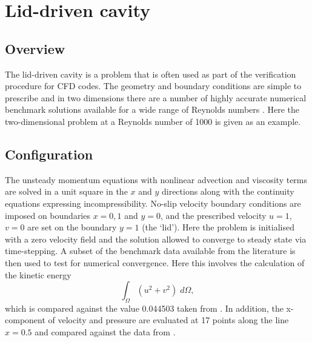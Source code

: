\section{Lid-driven cavity}
\label{sect:lid_driven_cavity}

\subsection{Overview}
The lid-driven cavity is a problem that is often used as part of the verification procedure for
CFD codes. The geometry and boundary conditions are simple to prescribe and in
two dimensions there are a number of highly accurate numerical benchmark solutions
available for a wide range of Reynolds numbers \citep{botella1998,bruneau2006,erturk2005}. Here the two-dimensional
problem at a Reynolds number of 1000 is given as an example.

\subsection{Configuration}
The unsteady momentum equations with nonlinear advection and viscosity
terms are solved in a unit square in the $x$ and $y$
directions along with the continuity equations expressing incompressibility. 
No-slip velocity boundary conditions are imposed on boundaries $x=0,1$ and $y=0$, and the prescribed velocity $u=1$, $v=0$ are
set on the boundary $y=1$ (the `lid'). Here the problem is initialised with a zero velocity field and the solution
allowed to converge to steady state via time-stepping.
A subset of the benchmark data available from the literature is then used to
test for numerical convergence. Here this involves the calculation of the kinetic energy
\begin{equation}
\int_{\Omega} (u^2+v^2) \; d\Omega,
\end{equation}
which is compared against the value 0.044503 taken from \cite{bruneau2006}. In addition, the x-component of velocity and
pressure are evaluated at 17 points along the line $x=0.5$ and compared against the data from \cite{botella1998}.



